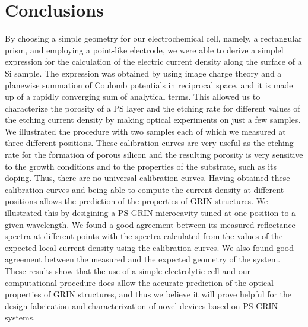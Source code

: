 \documentclass{article}
\begin{document}
\section{Conclusions}
\label{sec:conclusion}
By choosing a simple geometry for our electrochemical cell, namely, a
rectangular prism, and employing a point-like electrode, we were able
to derive a simplel expression for the calculation of the electric current
density along the surface of a Si sample. The expression was obtained
by using image charge theory and a planewise summation of Coulomb
potentials in reciprocal space, and it is made up of
a rapidly converging sum of analytical terms. This allowed us to
characterize the porosity of a PS layer and the etching
rate for different values of the etching current density by making
optical experiments on just a
few samples. We illustrated the procedure with two samples each of which we
measured at three different positions. These calibration curves are
very useful as the etching rate for the formation of porous silicon
and the resulting porosity is very sensitive to the growth conditions
and to the properties of the substrate, such as its doping. Thus,
there are no universal calibration curves. Having obtained these calibration curves
and being able to compute the current density at different positions
allows the prediction of the properties of GRIN structures. We
illustrated this by desigining a PS GRIN microcavity tuned at one
position to a given wavelength. We found a good agreement between its
measured reflectance spectra at different points with the spectra
calculated from the values of the expected local current
density using the calibration curves. We also found good agreement
between the measured and the expected geometry of the system. These
results show that the use of a simple electrolytic cell and our
computational procedure does allow the accurate prediction of the
optical properties of GRIN structures, and thus we believe it will
prove helpful for the design fabrication and characterization of novel
devices based on PS GRIN systems.
\end{document}
